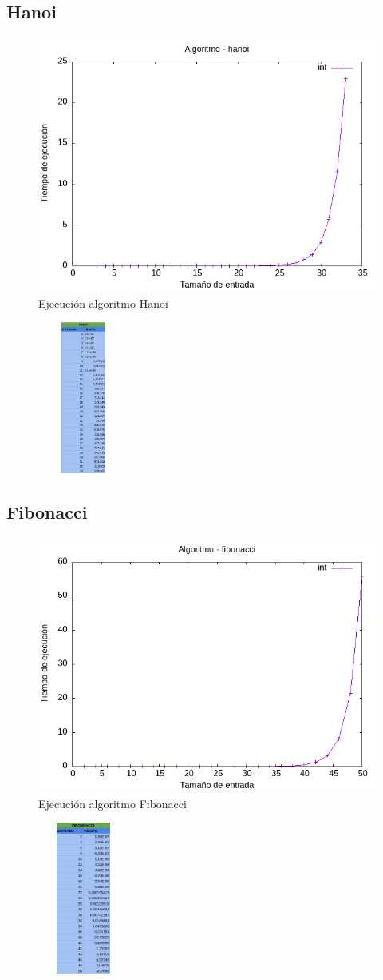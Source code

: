 \documentclass[11pt]{article}
\begin{document}
\subsection*{Hanoi}
\begin{figure}[H]
    
        \centering
        \includegraphics[width=0.5\linewidth]{assets/Img/hanoiint.png}
        \caption{Ejecución algoritmo Hanoi}
        \label{fig:hanoi}       
\end{figure}
\begin{figure}[H]
    \centering
    \includegraphics[width=3cm, height=5cm]{assets/Img/hanoitabla.png}
\end{figure}
\subsection{Fibonacci}
\begin{figure}[H]
    \centering
        \includegraphics[width=0.5\linewidth]{assets/Img/fibonacciint.png}
        \caption{Ejecución algoritmo Fibonacci}
        \label{fig:fibonacci}
\end{figure}
\begin{figure}[H]
    \centering
    \includegraphics[width=3cm, height=5cm]{assets/Img/fibonaccitabla.png}
\end{figure}
\end{document}
